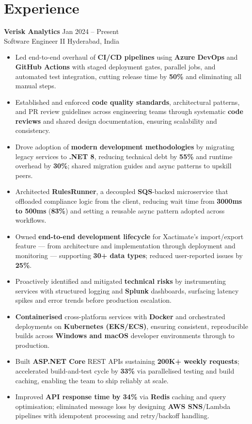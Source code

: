 \documentclass[10pt,letterpaper]{article}
\newcommand{\resumeSubheading}[4]{%
  \textbf{#1} \hfill #2 \\
  #3 \hfill #4 \\
}
\begin{document}
\section*{Experience}
\resumeSubheading{Verisk Analytics}{Jan 2024 -- Present}{Software Engineer II}{Hyderabad, India}
\begin{itemize}
    \item Led end-to-end overhaul of \textbf{CI/CD pipelines} using \textbf{Azure DevOps} and \textbf{GitHub Actions} with staged deployment gates, parallel jobs, and automated test integration, cutting release time by \textbf{50\%} and eliminating all manual steps.
    \item Established and enforced \textbf{code quality standards}, architectural patterns, and PR review guidelines across engineering teams through systematic \textbf{code reviews} and shared design documentation, ensuring scalability and consistency.
    \item Drove adoption of \textbf{modern development methodologies} by migrating legacy services to \textbf{.NET 8}, reducing technical debt by \textbf{55\%} and runtime overhead by \textbf{30\%}; shared migration guides and async patterns to upskill peers.
    \item Architected \textbf{RulesRunner}, a decoupled \textbf{SQS}-backed microservice that offloaded compliance logic from the client, reducing wait time from \textbf{3000ms to 500ms} (\textbf{83\%}) and setting a reusable async pattern adopted across workflows.
    \item Owned \textbf{end-to-end development lifecycle} for Xactimate's import/export feature --- from architecture and implementation through deployment and monitoring --- supporting \textbf{30+ data types}; reduced user-reported issues by \textbf{25\%}.
    \item Proactively identified and mitigated \textbf{technical risks} by instrumenting services with structured logging and \textbf{Splunk} dashboards, surfacing latency spikes and error trends before production escalation.
    \item \textbf{Containerised} cross-platform services with \textbf{Docker} and orchestrated deployments on \textbf{Kubernetes (EKS/ECS)}, ensuring consistent, reproducible builds across \textbf{Windows and macOS} developer environments through to production.
    \item Built \textbf{ASP.NET Core} REST APIs sustaining \textbf{200K+ weekly requests}; accelerated build-and-test cycle by \textbf{33\%} via parallelised testing and build caching, enabling the team to ship reliably at scale.
    \item Improved \textbf{API response time by 34\%} via \textbf{Redis} caching and query optimisation; eliminated message loss by designing \textbf{AWS SNS}/Lambda pipelines with idempotent processing and retry/backoff handling.
\end{itemize}
\end{document}
